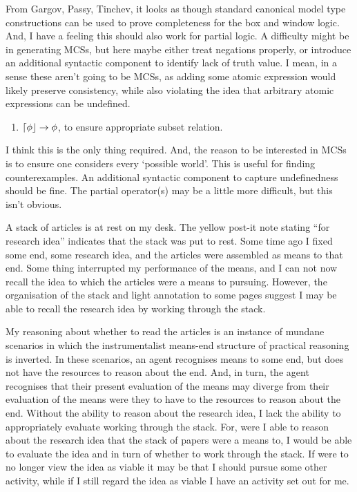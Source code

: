 \documentclass[10pt]{article}
\begin{document}
From Gargov, Passy, Tinchev, it looks as though standard canonical model type constructions can be used to prove completeness for the box and window logic.
And, I have a feeling this should also work for partial logic.
A difficulty might be in generating MCSs, but here maybe either treat negations properly, or introduce an additional syntactic component to identify lack of truth value.
I mean, in a sense these aren't going to be MCSs, as adding some atomic expression would likely preserve consistency, while also violating the idea that arbitrary atomic expressions can be undefined.

\begin{enumerate}
\item \(\mathord{\lceil{\phi}\rfloor} \rightarrow \phi\), to ensure appropriate subset relation.
\end{enumerate}

I think this is the only thing required.
And, the reason to be interested in MCSs is to ensure one considers every `possible world'.
This is useful for finding counterexamples.
An additional syntactic component to capture undefinedness should be fine.
The partial operator(s) may be a little more difficult, but this isn't obvious.



\newpage

A stack of articles is at rest on my desk.
The yellow post-it note stating ``for research idea'' indicates that the stack was put to rest.
Some time ago I fixed some end, some research idea, and the articles were assembled as means to that end.
Some thing interrupted my performance of the means, and I can not now recall the idea to which the articles were a means to pursuing.
However, the organisation of the stack and light annotation to some pages suggest I may be able to recall the research idea by working through the stack.

My reasoning about whether to read the articles is an instance of mundane scenarios in which the instrumentalist means-end structure of practical reasoning is inverted.
In these scenarios, an agent recognises means to some end, but does not have the resources to reason about the end.
And, in turn, the agent recognises that their present evaluation of the means may diverge from their evaluation of the means were they to have to the resources to reason about the end.
Without the ability to reason about the research idea, I lack the ability to appropriately evaluate working through the stack.
For, were I able to reason about the research idea that the stack of papers were a means to, I would be able to evaluate the idea and in turn of whether to work through the stack.
If were to no longer view the idea as viable it may be that I should pursue some other activity, while if I still regard the idea as viable I have an activity set out for me.
\end{document}
